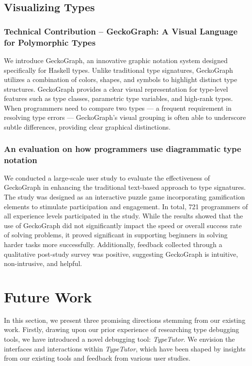 \subsection{Visualizing Types}

\subsubsection{Technical Contribution -- GeckoGraph: A Visual Language for Polymorphic Types}

We introduce GeckoGraph, an innovative graphic notation system designed specifically for Haskell types. Unlike traditional type signatures, GeckoGraph utilizes a combination of colors, shapes, and symbols to highlight distinct type structures. GeckoGraph provides a clear visual representation for type-level features such as type classes, parametric type variables, and high-rank types. When programmers need to compare two types — a frequent requirement in resolving type errors — GeckoGraph's visual grouping is often able to underscore subtle differences, providing clear graphical distinctions.

\subsubsection{An evaluation on how programmers use diagrammatic type notation}

We conducted a large-scale user study to evaluate the effectiveness of GeckoGraph in enhancing the traditional text-based approach to type signatures. The study was designed as an interactive puzzle game incorporating gamification elements to stimulate participation and engagement. In total,  721 programmers of all experience levels participated in the study. While the results showed that the use of GeckoGraph did not significantly impact the speed or overall success rate of solving problems, it proved significant in supporting beginners in solving harder tasks more successfully. Additionally, feedback collected through a qualitative post-study survey was positive, suggesting GeckoGraph is intuitive, non-intrusive, and helpful.

\section{Future Work}

In this section, we present three promising directions stemming from our existing work. Firstly, drawing upon our prior experience of researching type debugging tools, we have introduced a novel debugging tool: \textit{TypeTutor}. We  envision the interfaces and interactions within \textit{TypeTutor}, which have been shaped by insights from our existing tools and feedback from various user studies.

